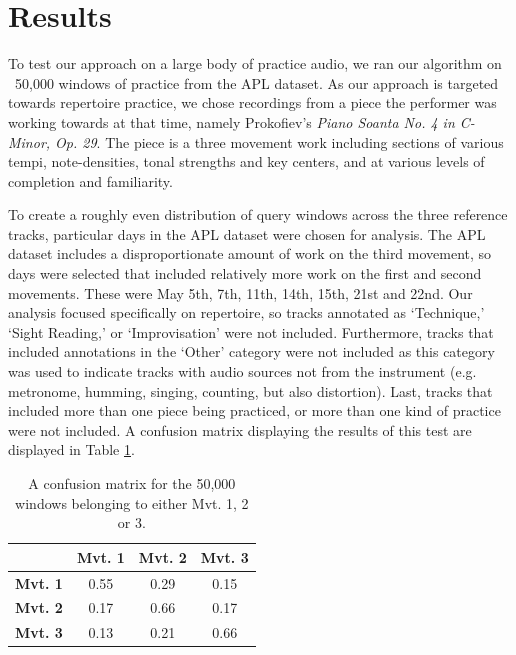 \documentclass{article}
\begin{document}
\section{Results}
\label{sec:Results}

To test our approach on a large body of practice audio, we ran our algorithm on ~50,000 windows of practice from the APL dataset. As our approach is targeted towards repertoire practice, we chose recordings from a piece the performer was working towards at that time, namely Prokofiev's \textit{Piano Soanta No. 4 in C-Minor, Op. 29}. The piece is a three movement work including sections of various tempi, note-densities, tonal strengths and key centers, and at various levels of completion and familiarity.

To create a roughly even distribution of query windows across the three reference tracks, particular days in the APL dataset were chosen for analysis.  The APL dataset includes a disproportionate amount of work on the third movement, so days were selected that included relatively more work on the first and second movements. These were May 5th, 7th, 11th, 14th, 15th, 21st and 22nd.  Our analysis focused specifically on repertoire, so tracks annotated as `Technique,' `Sight Reading,' or `Improvisation' were not included. Furthermore, tracks that included annotations in the `Other' category were not included as this category was used to indicate tracks with audio sources not from the instrument (e.g. metronome, humming, singing, counting, but also distortion). Last, tracks that included more than one piece being practiced, or more than one kind of practice were not included.  A confusion matrix displaying the results of this test are displayed in Table \ref{tab:confMat}.  


\begin{table}[ht!]
\centering
\caption{A confusion matrix for the 50,000 windows belonging to either Mvt. 1, 2 or 3.}
\begin{tabular}{|c|c|c|c|}
\hline
& \textbf{Mvt. 1} & \textbf{Mvt. 2} & \textbf{Mvt. 3} \\\hline
\textbf{Mvt. 1} & 0.55 & 0.29 & 0.15 \\\hline
\textbf{Mvt. 2} & 0.17 & 0.66 & 0.17 \\\hline
\textbf{Mvt. 3} & 0.13 & 0.21 & 0.66 \\\hline
\end{tabular}
\label{tab:confMat}
\end{table}
\end{document}
